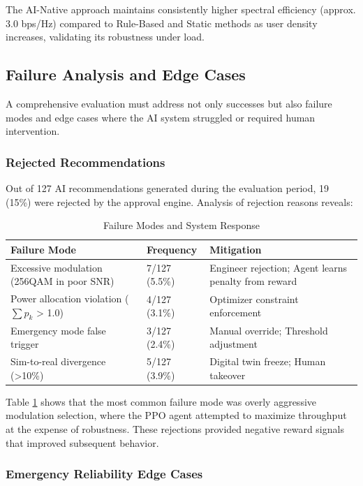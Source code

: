 \documentclass[conference]{IEEEtran}
\begin{document}
The AI-Native approach maintains consistently higher spectral efficiency (approx. 3.0 bps/Hz) compared to Rule-Based and Static methods as user density increases, validating its robustness under load.

\subsection{Failure Analysis and Edge Cases}

A comprehensive evaluation must address not only successes but also failure modes and edge cases where the AI system struggled or required human intervention.

\subsubsection{Rejected Recommendations}

Out of 127 AI recommendations generated during the evaluation period, 19 (15\%) were rejected by the approval engine. Analysis of rejection reasons reveals:

\begin{table}[h]
\caption{Failure Modes and System Response}
\centering
\begin{tabular}{|p{3cm}|p{2cm}|p{2.5cm}|}
\hline
\textbf{Failure Mode} & \textbf{Frequency} & \textbf{Mitigation} \\
\hline
Excessive modulation (256QAM in poor SNR) & 7/127 (5.5\%) & Engineer rejection; Agent learns penalty from reward \\
\hline
Power allocation violation ($\sum p_k$ > 1.0) & 4/127 (3.1\%) & Optimizer constraint enforcement \\
\hline
Emergency mode false trigger & 3/127 (2.4\%) & Manual override; Threshold adjustment \\
\hline
Sim-to-real divergence (>10\%) & 5/127 (3.9\%) & Digital twin freeze; Human takeover \\
\hline
\end{tabular}
\label{tab:failures}
\end{table}

Table \ref{tab:failures} shows that the most common failure mode was overly aggressive modulation selection, where the PPO agent attempted to maximize throughput at the expense of robustness. These rejections provided negative reward signals that improved subsequent behavior.

\subsubsection{Emergency Reliability Edge Cases}
\end{document}
